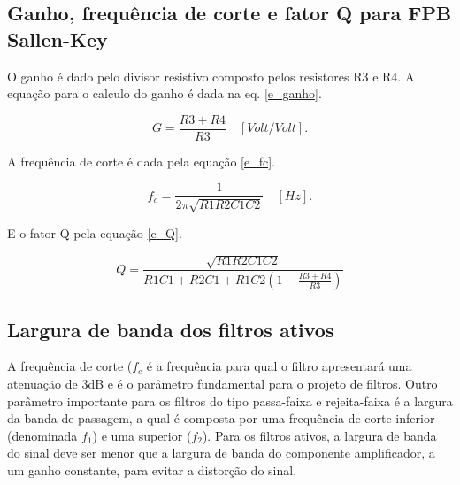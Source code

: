 \subsection{Ganho, frequência de corte e fator Q para FPB Sallen-Key}
O ganho é dado pelo divisor resistivo composto pelos resistores R3 e R4. A equação para o calculo do ganho é dada na eq. \ref{e_ganho}.

\begin{equation}
G = \frac{R3+R4}{R3} \quad [Volt/Volt].
\label{e_ganho}
\end{equation}

A frequência de corte é dada pela equação \ref{e_fc}.

\begin{equation}
f_c = \frac{1}{2\pi\sqrt{R1R2C1C2}} \quad [Hz]. 
\label{e_fc}
\end{equation}

E o fator Q pela equação \ref{e_Q}.

\begin{equation}
Q = \frac{\sqrt{R1R2C1C2}}{R1C1 + R2C1 + R1C2(1-\frac{R3+R4}{R3})}
\label{e_Q}
\end{equation}

\subsection{Largura de banda dos filtros ativos}
A frequência de corte ($f_c$ é a frequência para qual o filtro apresentará uma atenuação de 3dB e é o parâmetro fundamental para o projeto de filtros.
Outro parâmetro importante para os filtros do tipo passa-faixa e rejeita-faixa é a largura da banda de passagem, a qual é composta por uma frequência de corte inferior (denominada $f_1$) e uma superior ($f_2$). Para os filtros ativos, a largura de banda do sinal deve ser menor que a largura de banda do componente amplificador, a um ganho constante, para evitar a distorção do sinal.

